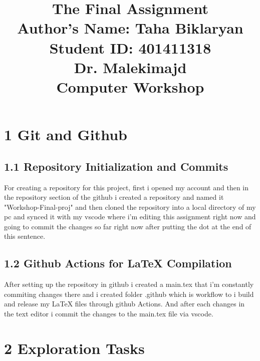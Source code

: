 \documentclass{article}
\title{\Huge The Final Assignment \\[1cm]
\Large Author's Name: Taha Biklaryan \\[0.5cm]
\large Student ID: 401411318 \\[1cm]  
\large Dr. Malekimajd \\[1cm]
\large Computer Workshop}
\date{} %
\begin{document}
\maketitle
\newpage
\section*{\Huge 1 Git and Github}
\subsection*{\Large 1.1 Repository Initialization and Commits}
For creating a repository for this project, first i opened my account and then in the repository section of the github i created a repository and named it "Workshop-Final-proj" and then 
cloned the repository into a local directory of my pc and synced it with my vscode where i'm editing this assignment right now and going to commit the changes so far right now after putting the dot
at the end of this sentence.
\subsection*{\large 1.2 Github Actions for LaTeX Compilation}
After setting up the repository in github i created a main.tex that i'm constantly commiting changes there
and i created folder .github which is workflow to i build and release my LaTeX files through github Actions.
And after each changes in the text editor i commit the changes to the main.tex file via vscode.


\section*{\Huge 2 Exploration Tasks}
\end{document}
